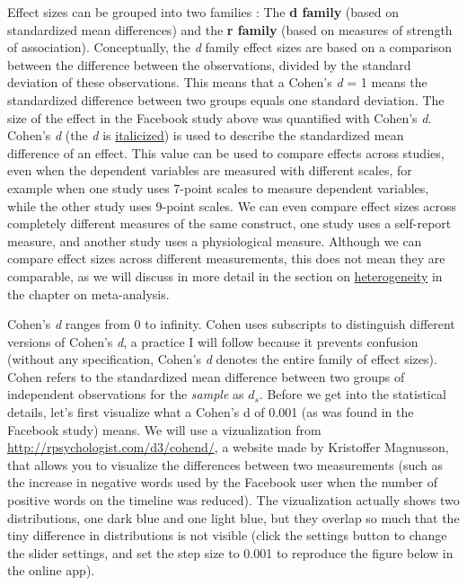 \documentclass[
]{krantz}
\begin{document}
Effect sizes can be grouped into two families \citep{rosenthal_contrasts_2000}: The \textbf{d family} (based on standardized mean differences) and the \textbf{r family} (based on measures of strength of association). Conceptually, the \emph{d} family effect sizes are based on a comparison between the difference between the observations, divided by the standard deviation of these observations. This means that a Cohen's \emph{d} = 1 means the standardized difference between two groups equals one standard deviation. The size of the effect in the Facebook study above was quantified with Cohen's \emph{d}. Cohen's \emph{d} (the \emph{d} is \href{https://blog.apastyle.org/apastyle/2011/08/the-grammar-of-mathematics-writing-about-variables.html}{italicized}) is used to describe the standardized mean difference of an effect. This value can be used to compare effects across studies, even when the dependent variables are measured with different scales, for example when one study uses 7-point scales to measure dependent variables, while the other study uses 9-point scales. We can even compare effect sizes across completely different measures of the same construct, one study uses a self-report measure, and another study uses a physiological measure. Although we can compare effect sizes across different measurements, this does not mean they are comparable, as we will discuss in more detail in the section on \protect\hyperlink{heterogeneity}{heterogeneity} in the chapter on meta-analysis.

Cohen's \emph{d} ranges from 0 to infinity. Cohen \citeyearpar{cohen_statistical_1988} uses subscripts to distinguish different versions of Cohen's \emph{d}, a practice I will follow because it prevents confusion (without any specification, Cohen's \emph{d} denotes the entire family of effect sizes). Cohen refers to the standardized mean difference between two groups of independent observations for the \emph{sample} as \(d_s\). Before we get into the statistical details, let's first visualize what a Cohen's d of 0.001 (as was found in the Facebook study) means. We will use a vizualization from \url{http://rpsychologist.com/d3/cohend/}, a website made by Kristoffer Magnusson, that allows you to visualize the differences between two measurements (such as the increase in negative words used by the Facebook user when the number of positive words on the timeline was reduced). The vizualization actually shows two distributions, one dark blue and one light blue, but they overlap so much that the tiny difference in distributions is not visible (click the settings button to change the slider settings, and set the step size to 0.001 to reproduce the figure below in the online app).
\end{document}
